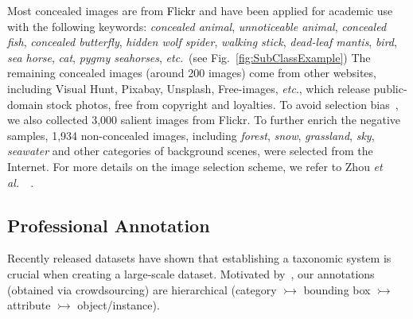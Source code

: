 \documentclass[10pt,journal,compsoc]{IEEEtran}
\def\etc{\emph{etc}}
\def\etal{{\em et al.~}}
\newcommand{\figref}[1]{Fig.~\ref{#1}}
\newcommand{\Rev}[1]{\textcolor{black}{#1}}
\begin{document}
Most concealed images are from \Rev{Flickr} and have been applied for academic
use with the following keywords:
\emph{concealed animal}, \emph{unnoticeable animal}, \emph{concealed fish},
\emph{concealed butterfly}, \emph{hidden wolf spider}, \emph{walking stick},
\emph{dead-leaf mantis}, \emph{bird}, \emph{sea horse}, \emph{cat},
\emph{pygmy seahorses}, \etc.~(see \figref{fig:SubClassExample})
%
The remaining concealed images (around 200 images) come from other websites,
including Visual Hunt, Pixabay, Unsplash, Free-images, \etc.,
which release public-domain stock photos, free from copyright and loyalties.
%
To avoid selection bias~\cite{Fan2021SOC}, 
we also collected 3,000 salient images from Flickr. 
To further enrich the negative samples, 1,934 non-concealed
images, including \emph{forest}, \emph{snow}, \emph{grassland}, \emph{sky}, \emph{seawater}
and other categories of background scenes, were selected from the Internet.
For more details on the image selection scheme, we refer to Zhou \etal~\cite{zhou2017places}.


\subsection{Professional Annotation}

Recently released datasets
\cite{wang2018revisiting,Fan2019D3Net,damen2018scaling} 
have shown that establishing a taxonomic system is crucial when creating 
a large-scale dataset.
%
Motivated by~\cite{mo2019partnet}, our annotations (obtained via crowdsourcing) 
are hierarchical (category $\rightarrowtail$ bounding box $\rightarrowtail$
attribute $\rightarrowtail$  object/instance). 
\end{document}
